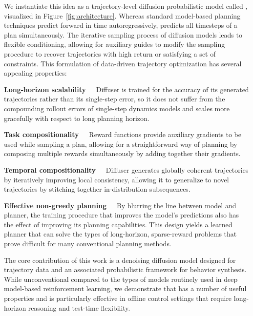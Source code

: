 

We instantiate this idea as a trajectory-level diffusion probabilistic model \citep{sohldickstein2015nonequilibrium,ho2020denoising} called \method{}, visualized in Figure~\ref{fig:architecture}.
Whereas standard model-based planning techniques predict forward in time autoregressively, \method{} predicts all timesteps of a plan simultaneously.
The iterative sampling process of diffusion models leads to flexible conditioning, allowing for auxiliary guides to modify the sampling procedure to recover trajectories with high return or satisfying a set of constraints.
This formulation of data-driven trajectory optimization has several appealing properties:

\textbf{Long-horizon scalability~~}
Diffuser is trained for the accuracy of its generated trajectories rather than its single-step error, so it does not suffer from the compounding rollout errors of single-step dynamics models and scales more gracefully with respect to long planning horizon.

\textbf{Task compositionality~~}
Reward functions provide auxiliary gradients to be used while sampling a plan, allowing for a straightforward way of planning by composing multiple rewards simultaneously by adding together their gradients.

\textbf{Temporal compositionality~~}
Diffuser generates globally coherent trajectories by iteratively improving local consistency, allowing it to generalize to novel trajectories by stitching together in-distribution subsequences.

\textbf{Effective non-greedy planning~~}
By blurring the line between model and planner, the training procedure that improves the model's predictions also has the effect of improving its planning capabilities.
This design yields a learned planner that can solve the types of long-horizon, sparse-reward problems that prove difficult for many conventional planning methods.

The core contribution of this work is a denoising diffusion model designed for trajectory data and an associated probabilistic framework for behavior synthesis.
While unconventional compared to the types of models routinely used in deep model-based reinforcement learning, we demonstrate that \method has a number of useful properties and is particularly effective in offline control settings that require long-horizon reasoning and test-time flexibility.
